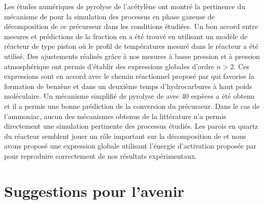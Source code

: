 Les études numériques de pyrolyse de l'acétylène ont montré la pertinence du mécanisme de \citet{Norinaga2009} pour la simulation des processus en phase gazeuse de décomposition de ce précurseur dans les conditions étudiées. Un bon accord entre mesures et prédictions de la fraction en  a été trouvé en utilisant un modèle de réacteur de type piston où le profil de températures mesuré dans le réacteur a été utilisé. Des ajustements réalisés grâce à nos mesures à basse pression et à pression atmosphérique ont permis d'établir des expressions globales d'ordre $n>2$. Ces expressions sont en accord avec le chemin réactionnel proposé par \citet{Norinaga2005} qui favorise la formation de benzène et dans un deuxième temps d'hydrocarbures à haut poids moléculaire. Un mécanisme simplifié de pyrolyse de  avec 40 espèces a été obtenu et il a permis une bonne prédiction de la conversion du précurseur. Dans le cas de l'ammoniac, aucun des mécanismes obtenus de la littérature n'a permis directement une simulation pertinente des processus étudiés. Les parois en quartz du réacteur semblent jouer un rôle important sur la décomposition de  et nous avons proposé une expression globale utilisant l'énergie d'activation proposée par \citet{Cooper1988} pour reproduire correctement de nos résultats expérimentaux.

\chapter*{Suggestions pour l'avenir}


